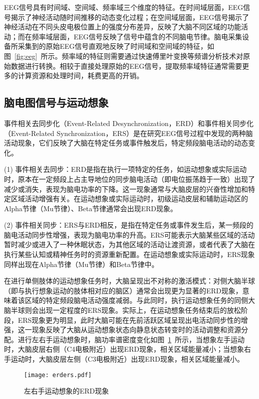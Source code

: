 EEG信号具有时间域、空间域、频率域三个维度的特征。在时间域层面，EEG信号揭示了神经活动随时间推移的动态变化过程；在空间域层面，EEG信号揭示了神经活动在不同头皮电极位置上的强度分布差异，反映了大脑不同区域的功能活动；而在频率域层面，EEG信号反映了信号中蕴含的不同脑电节律。脑电采集设备所采集到的原始EEG信号直观地反映了时间域和空间域的特征，如图~\ref{fig:eeg}~所示。频率域的特征则需要通过快速傅里叶变换等频谱分析技术对原始数据进行转换。相较于直接处理原始的EEG信号，提取频率域特征通常需要更多的计算资源和处理时间，耗费更高的开销。

\subsection{脑电图信号与运动想象}

事件相关去同步化（Event-Related Desynchronization，ERD）和事件相关同步化（Event-Related Synchronization，ERS）是在研究EEG信号过程中发现的两种脑活动现象，它们反映了大脑在特定任务或事件触发后，特定频段脑电活动的动态变化。

(1) 事件相关去同步：ERD是指在执行一项特定的任务，如运动想象或实际运动时，原本在一定频段上占主导地位的同步脑电活动（即电位振荡趋于一致）出现了减少或消失，表现为脑电功率的下降。这一现象通常与大脑皮层的兴奋性增加和特定区域活动增强有关。在运动想象或实际运动时，初级运动皮层和辅助运动区的Alpha节律（Mu节律）、Beta节律通常会出现ERD现象。

(2) 事件相关同步：ERS与ERD相反，是指在特定任务或事件发生后，某一频段的脑电活动同步性增强，表现为脑电功率的升高。ERS可能表示大脑某些区域的活动暂时减少或进入了一种休眠状态，为其他区域的活动让渡资源，或者代表了大脑在执行某些认知或精神任务时的资源重新配置。在运动想象或实际运动时，ERS现象同样出现在Alpha节律（Mu节律）和Beta节律中。

在进行单侧肢体的运动想象任务时，大脑呈现出不对称的激活模式：对侧大脑半球（即与执行想象运动的肢体相对应的脑区）通常会出现更为显著的ERD现象，意味着该区域的特定频段脑电活动强度减弱\cite{pfurtscheller1977event}。与此同时，执行运动想象任务的同侧大脑半球则会出现一定程度的ERS现象。实际上，在运动想象任务结束后的放松阶段，ERS现象更为明显，此时大脑可能在先前活跃区域呈现出电活动同步性的增强，这一现象反映了大脑从运动想象状态向静息状态转变时的活动调整和资源分配。进行左右手运动想象时，脑功率谱密度变化如图~\ref{fig:erders}~所示，当想象左手运动时，大脑皮层右侧（C4电极附近）出现ERD现象，相关区域能量减小；当想象右手运动时，大脑皮层左侧（C3电极附近）出现ERD现象，相关区域能量减小。
\begin{figure}
    \centering
    \texttt{[image: erders.pdf]}
    \caption{左右手运动想象的ERD现象}
    \label{fig:erders}
\end{figure}

